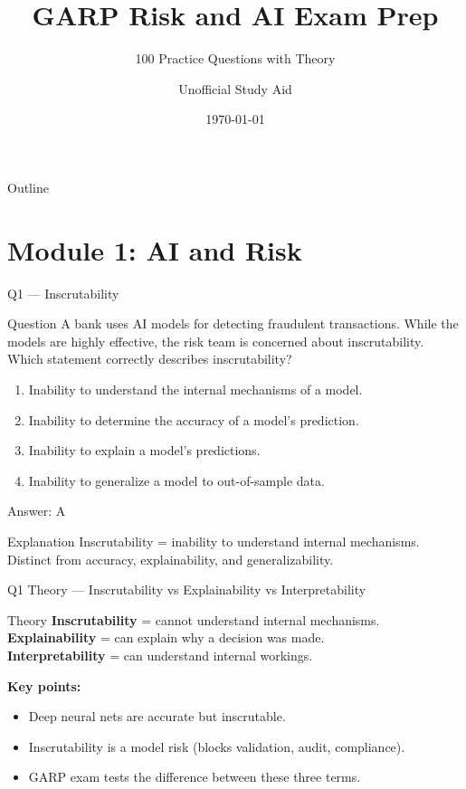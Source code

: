 \documentclass[aspectratio=169,8pt]{beamer}
\title{GARP Risk and AI Exam Prep}
\subtitle{100 Practice Questions with Theory}
\author{Unofficial Study Aid}
\date{\today}
\begin{document}
	
	\begin{frame}
		\titlepage
	\end{frame}
	
	\begin{frame}{Outline}
		\tableofcontents
	\end{frame}
	
	\section{Module 1: AI and Risk}
	
	\begin{frame}{Q1 --- Inscrutability}
		\begin{block}{Question}
			A bank uses AI models for detecting fraudulent transactions. While the models are highly effective, the risk team is concerned about inscrutability. Which statement correctly describes inscrutability?
		\end{block}
		\begin{enumerate}[label=\Alph*.]
			\item Inability to understand the internal mechanisms of a model.
			\item Inability to determine the accuracy of a model's prediction.
			\item Inability to explain a model's predictions.
			\item Inability to generalize a model to out-of-sample data.
		\end{enumerate}
		\begin{exampleblock}{Answer: A}
		\end{exampleblock}
		\begin{block}{Explanation}
			Inscrutability = inability to understand internal mechanisms. Distinct from accuracy, explainability, and generalizability.
		\end{block}
	\end{frame}
	
	\begin{frame}{Q1 Theory --- Inscrutability vs Explainability vs Interpretability}
		\begin{block}{Theory}
			\textbf{Inscrutability} = cannot understand internal mechanisms.\\
			\textbf{Explainability} = can explain why a decision was made.\\
			\textbf{Interpretability} = can understand internal workings.
			\vspace{2mm}
			
			\textbf{Key points:}
			\begin{itemize}
				\item Deep neural nets are accurate but inscrutable.
				\item Inscrutability is a model risk (blocks validation, audit, compliance).
				\item GARP exam tests the difference between these three terms.
			\end{itemize}
		\end{block}
	\end{frame}
	
\end{document}
